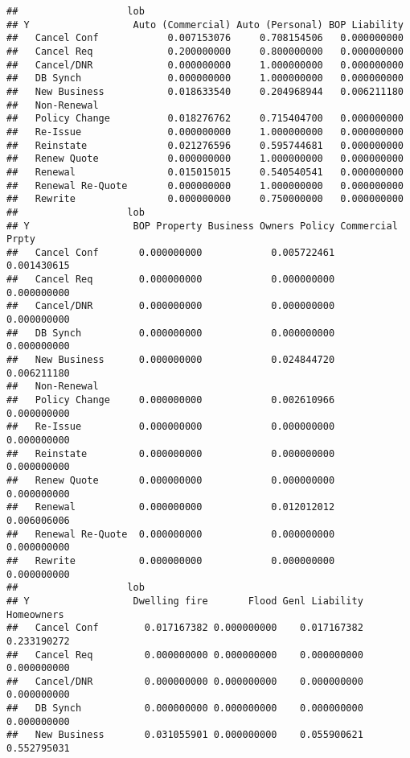 \documentclass[]{article}
\begin{document}
\begin{verbatim}
##                   lob
## Y                  Auto (Commercial) Auto (Personal) BOP Liability
##   Cancel Conf            0.007153076     0.708154506   0.000000000
##   Cancel Req             0.200000000     0.800000000   0.000000000
##   Cancel/DNR             0.000000000     1.000000000   0.000000000
##   DB Synch               0.000000000     1.000000000   0.000000000
##   New Business           0.018633540     0.204968944   0.006211180
##   Non-Renewal                                                     
##   Policy Change          0.018276762     0.715404700   0.000000000
##   Re-Issue               0.000000000     1.000000000   0.000000000
##   Reinstate              0.021276596     0.595744681   0.000000000
##   Renew Quote            0.000000000     1.000000000   0.000000000
##   Renewal                0.015015015     0.540540541   0.000000000
##   Renewal Re-Quote       0.000000000     1.000000000   0.000000000
##   Rewrite                0.000000000     0.750000000   0.000000000
##                   lob
## Y                  BOP Property Business Owners Policy Commercial Prpty
##   Cancel Conf       0.000000000            0.005722461      0.001430615
##   Cancel Req        0.000000000            0.000000000      0.000000000
##   Cancel/DNR        0.000000000            0.000000000      0.000000000
##   DB Synch          0.000000000            0.000000000      0.000000000
##   New Business      0.000000000            0.024844720      0.006211180
##   Non-Renewal                                                          
##   Policy Change     0.000000000            0.002610966      0.000000000
##   Re-Issue          0.000000000            0.000000000      0.000000000
##   Reinstate         0.000000000            0.000000000      0.000000000
##   Renew Quote       0.000000000            0.000000000      0.000000000
##   Renewal           0.000000000            0.012012012      0.006006006
##   Renewal Re-Quote  0.000000000            0.000000000      0.000000000
##   Rewrite           0.000000000            0.000000000      0.000000000
##                   lob
## Y                  Dwelling fire       Flood Genl Liability  Homeowners
##   Cancel Conf        0.017167382 0.000000000    0.017167382 0.233190272
##   Cancel Req         0.000000000 0.000000000    0.000000000 0.000000000
##   Cancel/DNR         0.000000000 0.000000000    0.000000000 0.000000000
##   DB Synch           0.000000000 0.000000000    0.000000000 0.000000000
##   New Business       0.031055901 0.000000000    0.055900621 0.552795031

\end{verbatim}
\end{document}
